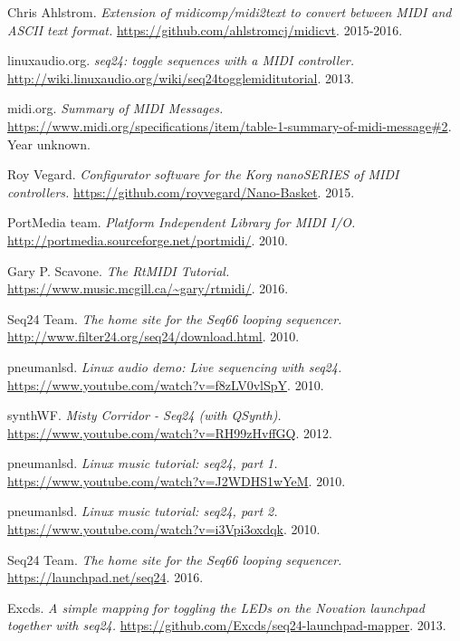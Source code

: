 \begin{thebibliography}{99}
   Chris Ahlstrom.
   \emph{Extension of midicomp/midi2text to convert between MIDI and ASCII
      text format.}
   \url{https://github.com/ahlstromcj/midicvt}.
   2015-2016.

   linuxaudio.org.
   \emph{seq24: toggle sequences with a MIDI controller.}
   \url{http://wiki.linuxaudio.org/wiki/seq24togglemiditutorial}.
   2013.

   midi.org.
   \emph{Summary of MIDI Messages.}
   \url{https://www.midi.org/specifications/item/table-1-summary-of-midi-message#2}.
   Year unknown.

   Roy Vegard.
   \emph{Configurator software for the Korg nanoSERIES of MIDI controllers.}
   \url{https://github.com/royvegard/Nano-Basket}.
   2015.

   PortMedia team.
   \emph{Platform Independent Library for MIDI I/O.}
   \url{http://portmedia.sourceforge.net/portmidi/}.
   2010.

   Gary P. Scavone.
   \emph{The RtMIDI Tutorial.}
   \url{https://www.music.mcgill.ca/~gary/rtmidi/}.
   2016.

   Seq24 Team.
   \emph{The home site for the Seq66 looping sequencer.}
   \url{http://www.filter24.org/seq24/download.html}.
   2010.

   pneumanlsd.
   \emph{Linux audio demo: Live sequencing with seq24.}
   \url{https://www.youtube.com/watch?v=f8zLV0vlSpY}.
   2010.

   synthWF.
   \emph{Misty Corridor - Seq24 (with QSynth).}
   \url{https://www.youtube.com/watch?v=RH99zHvffGQ}.
   2012.

   pneumanlsd.
   \emph{Linux music tutorial: seq24, part 1.}
   \url{https://www.youtube.com/watch?v=J2WDHS1wYeM}.
   2010.
   
   pneumanlsd.
   \emph{Linux music tutorial: seq24, part 2.}
   \url{https://www.youtube.com/watch?v=i3Vpi3oxdqk}.
   2010.

   Seq24 Team.
   \emph{The home site for the Seq66 looping sequencer.}
   \url{https://launchpad.net/seq24}.
   2016.

   Excds.
   \emph{A simple mapping for toggling the LEDs on the Novation launchpad
   together with seq24.}
   \url{https://github.com/Excds/seq24-launchpad-mapper}.
   2013.


\end{thebibliography}
